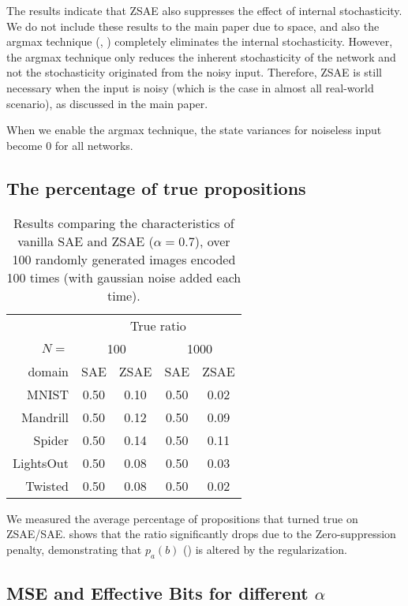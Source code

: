 \documentclass[10pt,letterpaper]{article}
\begin{document}
The results indicate that ZSAE also suppresses the effect of internal stochasticity.
We do not include these results to the main paper due to space,
and also the argmax technique (, )
completely eliminates the internal stochasticity.
However, the argmax technique only reduces the inherent stochasticity of the network
and not the stochasticity originated from the noisy input.
Therefore, ZSAE is still necessary when the input is noisy (which is the case in almost all real-world scenario),
as discussed in the main paper.

When we enable the argmax technique, the state variances for noiseless input become 0 for all networks.

\subsection{The percentage of true propositions}

\begin{table}[htbp]
 \centering
 \setlength{\tabcolsep}{0.45em}
 \begin{tabular}{|r|*{4}{c|}}
       & \multicolumn{4}{c|}{True ratio} \\
$N=$ & \multicolumn{2}{c|}{100} & \multicolumn{2}{c|}{1000} \\
domain    & SAE  & ZSAE & SAE  & ZSAE \\ 
MNIST     & 0.50 & 0.10 & 0.50 & 0.02 \\ 
Mandrill  & 0.50 & 0.12 & 0.50 & 0.09 \\ 
Spider    & 0.50 & 0.14 & 0.50 & 0.11 \\ 
LightsOut & 0.50 & 0.08 & 0.50 & 0.03 \\ 
Twisted   & 0.50 & 0.08 & 0.50 & 0.02 \\ 
\end{tabular}
 \caption{Results comparing the characteristics of vanilla SAE and ZSAE ($\alpha=0.7$),
 over 100 randomly generated images encoded 100 times (with gaussian noise added each time).
 }
\label{tab:trueratio}
\end{table}

We measured the average percentage of propositions that turned true on ZSAE/SAE.
 shows that the ratio significantly drops due to the Zero-suppression penalty,
demonstrating that $p_a(b)$ () is altered by the regularization.

\subsection{MSE and Effective Bits for different $\alpha$}
\label{more-sensitivity}
\end{document}
